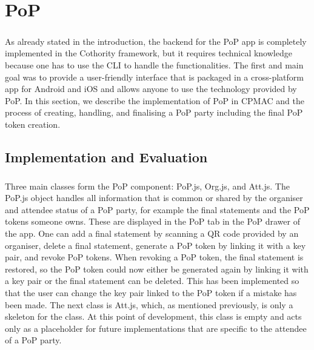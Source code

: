 \chapter{PoP}

\paragraph{}
As already stated in the introduction, the backend for the PoP app is completely implemented in the Cothority framework, but it requires technical knowledge because one has to use the CLI to handle the functionalities. The first and main goal was to provide a user-friendly interface that is packaged in a cross-platform app for Android and iOS and allows anyone to use the technology provided by PoP. In this section, we describe the implementation of PoP in CPMAC and the process of creating, handling, and finalising a PoP party including the final PoP token creation.

\section{Implementation and Evaluation}

\paragraph{}
Three main classes form the PoP component: PoP.js, Org.js, and Att.js. The PoP.js object handles all information that is common or shared by the organiser and attendee status of a PoP party, for example the final statements and the PoP tokens someone owns. These are displayed in the PoP tab in the PoP drawer of the app. One can add a final statement by scanning a QR code provided by an organiser, delete a final statement, generate a PoP token by linking it with a key pair, and revoke PoP tokens. When revoking a PoP token, the final statement is restored, so the PoP token could now either be generated again by linking it with a key pair or the final statement can be deleted. This has been implemented so that the user can change the key pair linked to the PoP token if a mistake has been made.
The next class is Att.js, which, as mentioned previously, is only a skeleton for the class. At this point of development, this class is empty and acts only as a placeholder for future implementations that are specific to the attendee of a PoP party.

